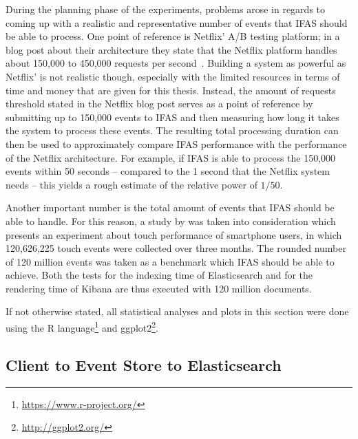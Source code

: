 During the planning phase of the experiments, problems arose in regards to coming up with a realistic and representative number of events that \ac{IFAS} should be able to process.
One point of reference is Netflix' A/B testing platform; in a blog post about their architecture they state that the Netflix platform handles about 150,000 to 450,000 requests per second~\cite{WEB:Netflix:2016}.
Building a system as powerful as Netflix' is not realistic though, especially with the limited resources in terms of time and money that are given for this thesis.
Instead, the amount of requests threshold stated in the Netflix blog post serves as a point of reference by submitting up to 150,000 events to \ac{IFAS} and then measuring how long it takes the system to process these events.
The resulting total processing duration can then be used to approximately compare \ac{IFAS} performance with the performance of the Netflix architecture.
For example, if \ac{IFAS} is able to process the 150,000 events within 50 seconds -- compared to the 1 second that the Netflix system needs -- this yields a rough estimate of the relative power of $1/50$.

Another important number is the total amount of events that \ac{IFAS} should be able to handle.
For this reason, a study by \citet{Henze2011} was taken into consideration which presents an experiment about touch performance of smartphone users, in which 120,626,225 touch events were collected over three months.
The rounded number of 120 million events was taken as a benchmark which \ac{IFAS} should be able to achieve.
Both the tests for the indexing time of Elasticsearch and for the rendering time of Kibana are thus executed with 120 million documents.

If not otherwise stated, all statistical analyses and plots in this section were done using the R language\footnote{\url{https://www.r-project.org/}} and ggplot2\footnote{\url{http://ggplot2.org/}}.

\subsection{Client to Event Store to Elasticsearch}
\label{subsec:evaluation:performance:evt-es-bridge}

